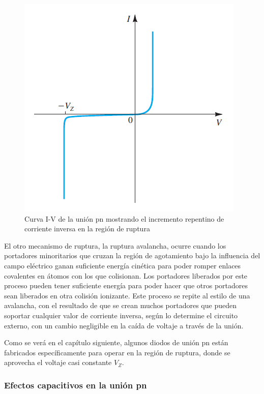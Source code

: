 \begin{figure}
    \centering
    \includegraphics[scale=0.6]{Electronica/diodo_f1.png}
    \caption{Curva I-V de la unión pn mostrando el incremento repentino de corriente inversa en la región de ruptura}
    \label{fig_rupturaInversaCorrienteUnionPN}
\end{figure}

El otro mecanismo de ruptura, la ruptura avalancha, ocurre cuando los portadores minoritarios que cruzan la región de agotamiento bajo la influencia del campo eléctrico ganan suficiente energía cinética para poder romper enlaces covalentes en átomos con los que colisionan. Los portadores liberados por este proceso pueden tener suficiente energía para poder hacer que otros portadores sean liberados en otra colisión ionizante. Este proceso se repite al estilo de una avalancha, con el resultado de que se crean muchos portadores que pueden soportar cualquier valor de corriente inversa, según lo determine el circuito externo, con un cambio negligible en la caída de voltaje a través de la unión.

Como se verá en el capítulo siguiente, algunos diodos de unión pn están fabricados específicamente para operar en la región de ruptura, donde se aprovecha el voltaje casi constante \( V_Z \).


\subsubsection{Efectos capacitivos en la unión pn}


